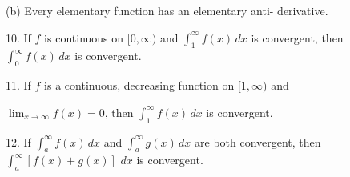 \documentclass{sebase}
\begin{document}
\begin{multicols}{2}
\begin{ExerciseList}
\begin{ExerciseList}
%

%

\item[(b)] Every elementary function has an elementary anti-\newline
derivative.

%

%
\end{ExerciseList}

\item[\hfill 10.] If $f$ is continuous on $[0,\infty )$ and $%
\int_{1}^{\infty }f\left( x\right) \,dx$ is convergent, then $%
\int_{0}^{\infty }f\left( x\right) \,dx$ is convergent.

%

\item[\hfill 11.] If $f$ is a continuous, decreasing function on $[1,\infty
) $ and

$\lim_{x\rightarrow \infty }f(x)=0$, then $\int_{1}^{\infty }f\left(
x\right) \,dx$ is convergent.

%

%

\item[\hfill 12.] If $\int_{a}^{\infty }f\left( x\right) \,dx$ and $%
\int_{a}^{\infty }g\left( x\right) \,dx$ are both convergent, then $%
\int_{a}^{\infty }[f\left( x\right) +g(x)]\,\,dx$ is convergent.


\end{ExerciseList}
\end{multicols}
\end{document}
